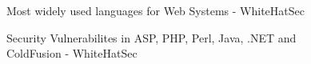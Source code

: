 \documentclass[../main.tex]{subfiles}
\begin{document}
\begin{figure}[H]
        \caption{\label{fig:mostlanguagesused} Most widely used languages for Web Systems - WhiteHatSec\cite{WhiteHatSec}}
      \end{figure}


\begin{figure}[H]
        \caption{\label{fig:languageattacks} Security Vulnerabilites in ASP, PHP, Perl, Java, .NET and ColdFusion - WhiteHatSec\cite{WhiteHatSec}}
      \end{figure}
      
\end{document}

